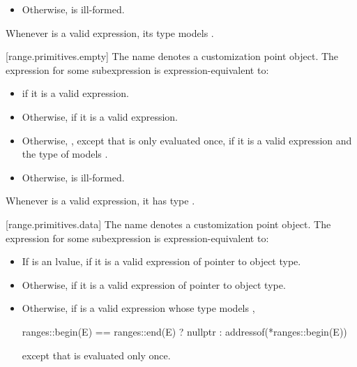 \begin{addedblock}
\begin{itemize}
\item
  Otherwise,  is ill-formed.
\end{itemize}

\pnum
\begin{note}
Whenever  is a valid expression, its
type models .
\end{note}

[range.primitives.empty]{}
\pnum
The name  denotes a customization point
object. The expression
 for some subexpression  is
expression-equivalent to:

\begin{itemize}
\item
   if it is a valid expression.

\item
  Otherwise,  if it is a valid expression.

\item
  Otherwise, ,
  except that  is only evaluated once, if it is a valid expression and the type of
   models .

\item
  Otherwise,  is ill-formed.
\end{itemize}

\pnum
\begin{note}
Whenever  is a valid expression,
it has type .
\end{note}

[range.primitives.data]{}
\pnum
The name  denotes a customization point
object. The expression
 for some subexpression  is
expression-equivalent to:

\begin{itemize}
\item
  If  is an lvalue, 
  if it is a valid expression of pointer to object type.

\item
  Otherwise,  if it is a valid expression
  of pointer to object type.

\item
  Otherwise, if  is a valid expression whose type models
  ,
  \begin{codeblock}
  ranges::begin(E) == ranges::end(E) ? nullptr : addressof(*ranges::begin(E))
  \end{codeblock}
  except that  is evaluated only once.


\end{itemize}
\end{addedblock}
